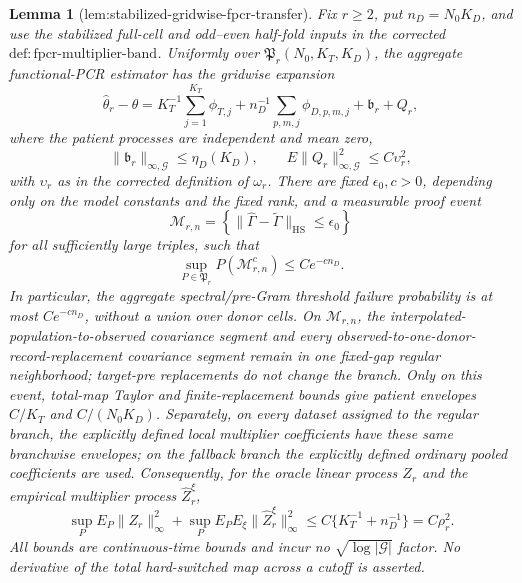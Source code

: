 \documentclass{article}
\newtheorem{lemma}{Lemma}
\begin{document}
\begin{lemma}[lem:stabilized-gridwise-fpcr-transfer]\label{lem:stabilized-gridwise-fpcr-transfer}
Fix \(r\ge2\), put \(n_D=N_0K_D\), and use the stabilized full-cell and odd--even half-fold inputs in the corrected \(\mathrm{def:fpcr\mbox{-}multiplier\mbox{-}band}\). Uniformly over \(\mathfrak P_r(N_0,K_T,K_D)\), the aggregate functional-PCR estimator has the gridwise expansion
\[
 \widehat\theta_r-\theta
 =K_T^{-1}\sum_{j=1}^{K_T}\phi_{T,j}
 +n_D^{-1}\sum_{p,m,j}\phi_{D,p,m,j}
 +\mathfrak b_r+Q_r,
\]
where the patient processes are independent and mean zero,
\[
 \|\mathfrak b_r\|_{\infty,\mathcal G}\le\eta_D(K_D),
 \qquad E\|Q_r\|_{\infty,\mathcal G}^2\le C\upsilon_r^2,
\]
with \(\upsilon_r\) as in the corrected definition of \(\omega_r\). There are fixed \(\epsilon_0,c>0\), depending only on the model constants and the fixed rank, and a measurable proof event
\[
 \mathcal M_{r,n}=\left\{\|\widehat\Gamma-\widetilde\Gamma\|_{\mathrm{HS}}\le\epsilon_0\right\}
\]
for all sufficiently large triples, such that
\[
 \sup_{P\in\mathfrak P_r}P(\mathcal M_{r,n}^c)\le Ce^{-cn_D}.
\]
In particular, the aggregate spectral/pre-Gram threshold failure probability is at most \(Ce^{-cn_D}\), without a union over donor cells.
On \(\mathcal M_{r,n}\), the interpolated-population-to-observed covariance segment and every observed-to-one-donor-record-replacement covariance segment remain in one fixed-gap regular neighborhood; target-pre replacements do not change the branch. Only on this event, total-map Taylor and finite-replacement bounds give patient envelopes \(C/K_T\) and \(C/(N_0K_D)\). Separately, on every dataset assigned to the regular branch, the explicitly defined local multiplier coefficients have these same branchwise envelopes; on the fallback branch the explicitly defined ordinary pooled coefficients are used. Consequently, for the oracle linear process \(Z_r\) and the empirical multiplier process \(\widehat Z_r^\xi\),
\[
 \sup_PE_P\|Z_r\|_\infty^2
 +\sup_PE_PE_\xi\|\widehat Z_r^\xi\|_\infty^2
 \le C\{K_T^{-1}+n_D^{-1}\}=C\rho_r^2.
\]
All bounds are continuous-time bounds and incur no \(\sqrt{\log|\mathcal G|}\) factor. No derivative of the total hard-switched map across a cutoff is asserted.
\end{lemma}
\end{document}
